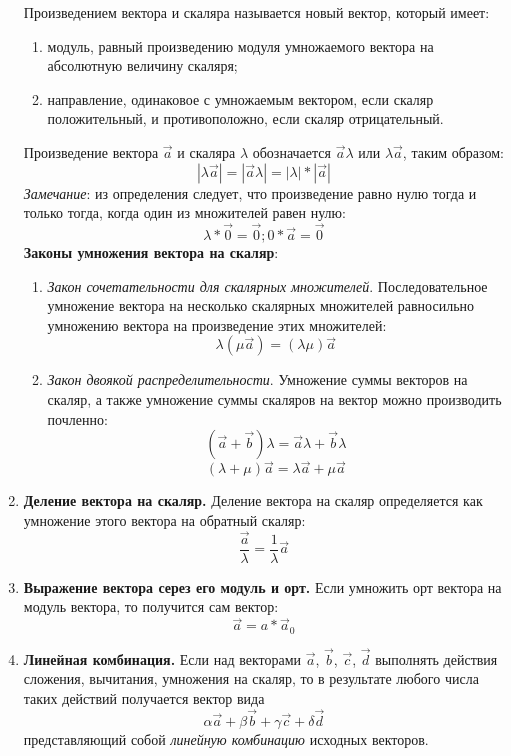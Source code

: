 \documentclass{article}
\begin{document}
\begin{enumerate}
  Произведением вектора и скаляра называется новый вектор, который имеет:
  \begin{enumerate}
      \item модуль, равный произведению модуля умножаемого вектора на абсолютную величину скаляря;
      \item направление, одинаковое с умножаемым вектором, если скаляр положительный, и противоположно, если скаляр отрицательный.
  \end{enumerate}
  Произведение вектора $\vec{a}$ и скаляра $\lambda$ обозначается $\vec{a}\lambda$ или $\lambda\vec{a}$, таким образом:
  $$|\lambda\vec{a}| = |\vec{a}\lambda| = |\lambda|*|\vec{a}|$$
  \textit{Замечание}: из определения следует, что произведение равно нулю тогда и только тогда, когда один из множителей равен нулю:
  $$\lambda*\vec{0} = \vec{0}; 0*\vec{a} = \vec{0}$$
  \textbf{Законы умножения вектора на скаляр}:
  \begin{enumerate}
      \item \textit{Закон сочетательности для скалярных множителей}. Последовательное умножение вектора на несколько скалярных множителей равносильно умножению вектора на произведение этих множителей:
      $$\lambda(\mu \vec{a}) = (\lambda \mu) \vec{a}$$
      \item \textit{Закон двоякой распределительности}. Умножение суммы векторов на скаляр, а также умножение суммы скаляров на вектор можно производить почленно:
      $$(\vec{a}+\vec{b})\lambda = \vec{a}\lambda+\vec{b}\lambda$$
      $$(\lambda+\mu)\vec{a} = \lambda\vec{a} + \mu \vec{a}$$
  \end{enumerate}
  \item \textbf{Деление вектора на скаляр.} Деление вектора на скаляр определяется как умножение этого вектора на обратный скаляр:
  $$\frac{\vec{a}}{\lambda} = \frac{1}{\lambda}\vec{a}$$
  \item \textbf{Выражение вектора серез его модуль и орт.} Если умножить орт вектора на модуль вектора, то получится сам вектор:
  $$\vec{a} = a*\vec{a}_{0}$$
  \item  \textbf{Линейная комбинация.} Если над векторами $\vec{a}$, $\vec{b}$, $\vec{c}$, $\vec{d}$ выполнять действия сложения, вычитания, умножения на скаляр, то в результате любого числа таких действий получается вектор вида
  $$\alpha \vec{a} + \beta \vec{b} + \gamma \vec{c} + \delta \vec{d}$$
  представляющий собой \textit{линейную комбинацию} исходных векторов.
\end{enumerate}
\end{document}
